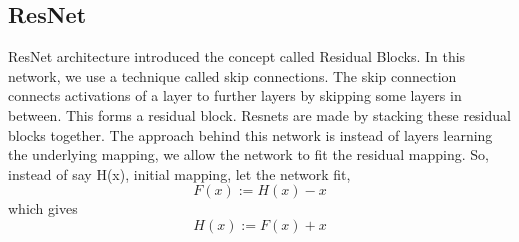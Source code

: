         \subsection{ResNet}
            ResNet architecture introduced the concept called Residual Blocks. In this network, we use a technique called skip connections. The skip connection connects activations of a  layer to further layers by skipping some layers in between. This forms a residual block. Resnets are made by stacking these residual blocks together. The approach behind this network is instead of layers learning the underlying mapping, we allow the network to fit the residual mapping. So, instead of say H(x), initial mapping, let the network fit,
            \begin{equation}
                F(x) := H(x) - x
            \end{equation}
            which gives
            \begin{equation}
                H(x) := F(x) + x
            \end{equation}
            \begin{figure}[hbt!]
            \end{figure}

        \newpage
